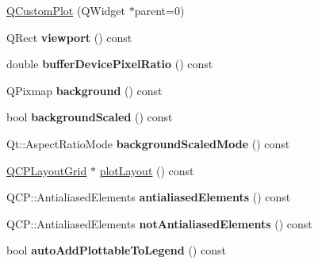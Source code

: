 \begin{DoxyCompactItemize}
\item 
\hyperlink{class_q_custom_plot_a45b99626558651a6428b83972b0b34b8}{Q\+Custom\+Plot} (Q\+Widget $\ast$parent=0)
\item 
Q\+Rect {\bfseries viewport} () const \hypertarget{class_q_custom_plot_a953ecdbc28018e7e84cb6213ad3d88c2}{}\label{class_q_custom_plot_a953ecdbc28018e7e84cb6213ad3d88c2}

\item 
double {\bfseries buffer\+Device\+Pixel\+Ratio} () const \hypertarget{class_q_custom_plot_a82ba278c2465520017ff269d713dd1bb}{}\label{class_q_custom_plot_a82ba278c2465520017ff269d713dd1bb}

\item 
Q\+Pixmap {\bfseries background} () const \hypertarget{class_q_custom_plot_a4643ddc8249cc4f51725650677c2b779}{}\label{class_q_custom_plot_a4643ddc8249cc4f51725650677c2b779}

\item 
bool {\bfseries background\+Scaled} () const \hypertarget{class_q_custom_plot_af9a6e0fe88e4b8ae5504ee9646abb121}{}\label{class_q_custom_plot_af9a6e0fe88e4b8ae5504ee9646abb121}

\item 
Qt\+::\+Aspect\+Ratio\+Mode {\bfseries background\+Scaled\+Mode} () const \hypertarget{class_q_custom_plot_a3394512baf54fbcdc7613ac44a07c3b6}{}\label{class_q_custom_plot_a3394512baf54fbcdc7613ac44a07c3b6}

\item 
\hyperlink{class_q_c_p_layout_grid}{Q\+C\+P\+Layout\+Grid} $\ast$ \hyperlink{class_q_custom_plot_afd280d4d621ae64a106543a545c508d7}{plot\+Layout} () const 
\item 
Q\+C\+P\+::\+Antialiased\+Elements {\bfseries antialiased\+Elements} () const \hypertarget{class_q_custom_plot_a81e954fbb485bb44c609e5707f0067b3}{}\label{class_q_custom_plot_a81e954fbb485bb44c609e5707f0067b3}

\item 
Q\+C\+P\+::\+Antialiased\+Elements {\bfseries not\+Antialiased\+Elements} () const \hypertarget{class_q_custom_plot_a8060cee59757213764382a78d3196189}{}\label{class_q_custom_plot_a8060cee59757213764382a78d3196189}

\item 
bool {\bfseries auto\+Add\+Plottable\+To\+Legend} () const \hypertarget{class_q_custom_plot_ad1599fc3fd1833b5988f6b89c1f616ca}{}\label{class_q_custom_plot_ad1599fc3fd1833b5988f6b89c1f616ca}


\end{DoxyCompactItemize}
